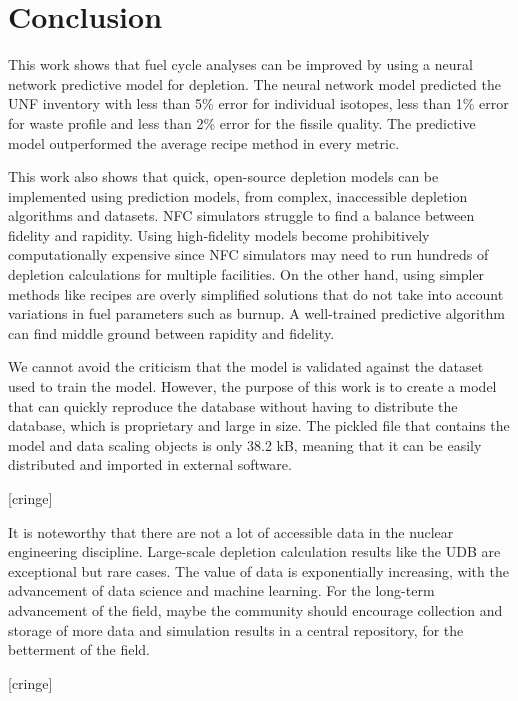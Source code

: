 \section{Conclusion}
This work shows that fuel cycle analyses can be improved
by using a neural network predictive model for depletion.
The neural network model predicted the \gls{UNF} inventory
with less than 5\% error for individual isotopes,
less than 1\% error for waste profile 
and less than 2\% error for the fissile quality.
The predictive model outperformed the average recipe
method in every metric.

This work also shows that quick, open-source depletion models
can be implemented using prediction models, from
complex, inaccessible depletion algorithms and
datasets. \gls{NFC} simulators struggle to find a balance
between fidelity and rapidity. Using high-fidelity
models become prohibitively computationally expensive
since \gls{NFC} simulators may need to run
hundreds of depletion calculations for multiple
facilities. On the other hand, using simpler methods
like recipes are overly simplified solutions
that do not take into account variations in fuel
parameters such as burnup.
A well-trained predictive algorithm can find middle
ground between rapidity and fidelity.

We cannot avoid the criticism that the model is validated
against the dataset used to train the model. However, the purpose
of this work is to create a model that can quickly reproduce the
database without having to distribute the database, which is proprietary
and large in size. The pickled file that contains
the model and data scaling objects is only 38.2 kB, meaning that it
can be easily distributed and imported in external software.

[cringe]

It is noteworthy that there are not a lot of accessible data in the
nuclear engineering discipline. Large-scale depletion
calculation results like the \gls{UDB} are exceptional
but rare cases. The value of data is exponentially increasing,
with the advancement of data science and machine learning.
For the long-term advancement of the field, maybe the
community should encourage collection and storage of more
data and simulation results in
a central repository, for the betterment of the field.

[cringe]

